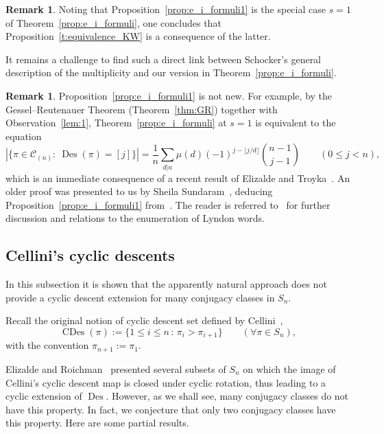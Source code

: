 \documentclass[10pt]{article}
\theoremstyle{definition}
\newtheorem{remark}[theorem]{Remark}
\newcommand{\C}{\mathcal C}
\DeclareMathOperator\Des{Des}
\DeclareMathOperator\CDes{CDes}
\begin{document}
\begin{remark}
    Noting that Proposition~\ref{prop:e_i_formuli1} is the special case $s=1$ of Theorem~\ref{prop:e_i_formuli}, one concludes that Proposition~\ref{t:equivalence_KW} is a consequence of the latter.
\end{remark}

It remains a challenge to find such a direct link between Schocker's general description of the multiplicity and our version in Theorem~\ref{prop:e_i_formuli}.

\begin{remark}\label{rem:ET}
    Proposition~\ref{prop:e_i_formuli1} 
    is not new.
    For example, by the Gessel--Reutenauer Theorem (Theorem~\ref{thm:GR}) together with Observation~\ref{lem:1}, 
    Theorem~\ref{prop:e_i_formuli} at $s=1$ is equivalent to the equation
    \[
        |\{\pi\in \C_{(n)}: \ \Des(\pi)=[j]\}|
        = \frac{1}{n} \sum_{d|n} \mu(d) (-1)^{j - \lfloor j/d \rfloor} \binom{n-1}{j-1}
        \qquad (0 \le j <n),        
    \]
    which is an immediate consequence of a recent result of Elizalde and Troyka~\cite[ Theorem 3.1]{ET}.  
    An older proof was presented to us by Sheila Sundaram~\cite{Sundaram_personal}, deducing 
    Proposition~\ref{prop:e_i_formuli1} 
    from~\cite[Lemma 2.7]{Sundaram_Adv}. 
    The reader is referred to~\cite{ET} for further discussion and relations to the enumeration of Lyndon words.  
\end{remark}


\subsection{Cellini's cyclic descents}\label{sec:Cellini}
	
In this subsection it is shown that the apparently natural approach does not provide a cyclic descent extension for many conjugacy classes in $S_n$.
	
Recall the original notion of cyclic descent set defined by Cellini~\cite{Cellini},
\[
	\CDes(\pi) 
	:= \{1 \leq i \leq n \,:\, \pi_i > \pi_{i+1} \}
    \qquad (\forall \pi \in S_n),
\]
with the convention $\pi_{n+1}:=\pi_1$.
	
Elizalde and Roichman~\cite{ER19} presented several subsets of $S_n$ on which the image of Cellini's cyclic descent map is closed under cyclic rotation, thus leading to a cyclic extension of $\Des$.
However, as we shall see, many conjugacy classes do not have this property. In fact, we conjecture that only two conjugacy classes have this property.
Here are some partial results.
	
\end{document}
